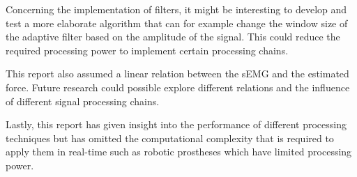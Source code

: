 Concerning the implementation of filters, it might be interesting to develop and test a more elaborate algorithm that can for example change the window size of the adaptive filter based on the amplitude of the signal. This could reduce the required processing power to implement certain processing chains.

This report also assumed a linear relation between the sEMG and the estimated force. Future research could possible explore different relations and the influence of different signal processing chains.

Lastly, this report has given insight into the performance of different processing techniques but has omitted the computational complexity that is required to apply them in real-time such as robotic prostheses \cite{semg_application_prosthesis} which have limited processing power. 